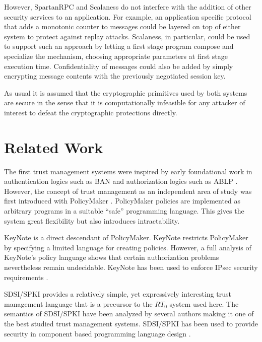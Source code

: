 However, SpartanRPC and Scalaness do not interfere with the addition of other security services
to an application. For example, an application specific protocol that adds a monotonic counter
to messages could be layered on top of either system to protect against replay attacks.
Scalaness, in particular, could be used to support such an approach by letting a first stage
program compose and specialize the mechanism, choosing appropriate parameters at first stage
execution time. Confidentiality of messages could also be added by simply encrypting message
contents with the previously negotiated session key.

As usual it is assumed that the cryptographic primitives used by both systems are secure in the
sense that it is computationally infeasible for any attacker of interest to defeat the
cryptographic protections directly.

\section{Related Work}


The first trust management systems were inspired by early foundational work in authentication
logics such as BAN \cite{Burrows:LA} and authorization logics such as ABLP \cite{Abadi:CACDS}.
However, the concept of trust management as an independent area of study was first introduced
with PolicyMaker \cite{Blaze:DTM,Blaze:CCPTMS}. PolicyMaker policies are implemented as
arbitrary programs in a suitable ``safe'' programming language. This gives the system great
flexibility but also introduces intractability.

KeyNote \cite{RFC-2704} is a direct descendant of PolicyMaker. KeyNote restricts PolicyMaker by
specifying a limited language for creating policies. However, a full analysis of KeyNote's
policy language \cite{Li:DCFTML} shows that certain authorization problems nevertheless remain
undecidable. KeyNote has been used to enforce IPsec security requirements
\cite{Blaze:TMIPS,Blaze:EKTMS}.

SDSI/SPKI \cite{Rivest:SDSI-11,RFC-2693} provides a relatively simple, yet expressively
interesting trust management language that is a precursor to the $RT_0$ system used here. The
semantics of SDSI/SPKI have been analyzed by several authors
\cite{Abadi:OSLLNS,Halpern:LSSLLNS,Howell:FSS,Li:LNSS,Clarke:CCDSS} making it one of the best
studied trust management systems. SDSI/SPKI has been used to provide security in component based
programming language design \cite{Liu:CSI}.

